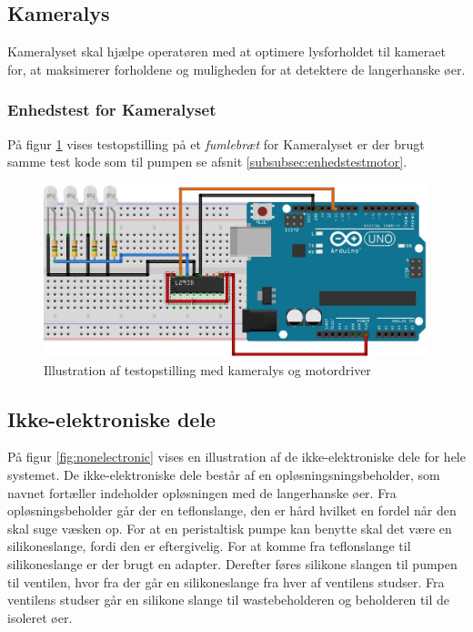 \newpage
 \subsection{Kameralys}
 \label{subsec:kameralys}
Kameralyset skal hjælpe operatøren med at optimere lysforholdet til kameraet for, at maksimerer forholdene og muligheden for at detektere de langerhanske øer.  

\subsubsection{Enhedstest for Kameralyset}
På figur \ref{fig:LEDbreadboard} vises testopstilling på et \textit{fumlebræt} for Kameralyset er der brugt samme test kode som til pumpen se afsnit \ref{subsubsec:enhedstestmotor}. 

\begin{figure}[H]
	\centering
	\includegraphics[width=1\textwidth]{billeder/Hardware/diagrammer/LEDbreadboard.JPG}
	\caption{Illustration af testopstilling med kameralys og motordriver}
	\label{fig:LEDbreadboard}
\end{figure}

 
\newpage 
\subsection{Ikke-elektroniske dele}
På figur \ref{fig:nonelectronic} vises en illustration af de ikke-elektroniske dele for hele systemet. De ikke-elektroniske dele består af en opløsningsningsbeholder, som navnet fortæller indeholder opløsningen med de langerhanske øer. Fra opløsningsbeholder går der en teflonslange, den er hård hvilket en fordel når den skal suge væsken op. For at en peristaltisk pumpe kan benytte skal det være en silikoneslange, fordi den er eftergivelig. For at komme fra teflonslange til silikoneslange er der brugt en adapter. Derefter føres silikone slangen til pumpen til ventilen, hvor fra der går en silikoneslange fra hver af ventilens studser. Fra ventilens studser går en silikone slange til wastebeholderen og beholderen til de isoleret øer.


